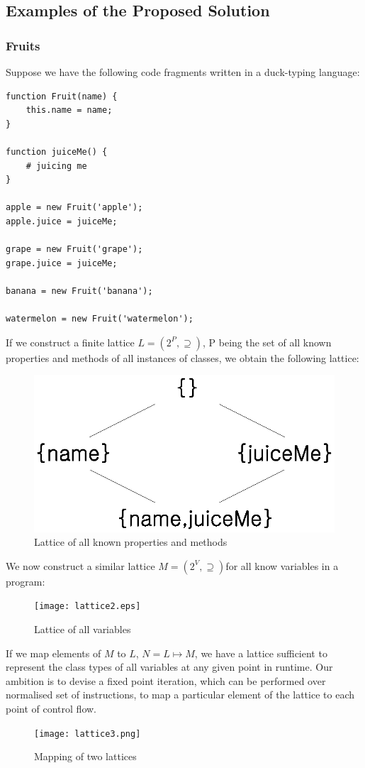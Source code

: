 \documentclass[a4paper,12pt]{article}
\begin{document}
\subsection{Examples of the Proposed Solution}
\subsubsection{Fruits}
Suppose we have the following code fragments written in a duck-typing language:\\
\begin{lstlisting}[caption=Example: Fruits]
function Fruit(name) {
	this.name = name;
}

function juiceMe() {
	# juicing me
}

apple = new Fruit('apple');
apple.juice = juiceMe;

grape = new Fruit('grape');
grape.juice = juiceMe;

banana = new Fruit('banana');

watermelon = new Fruit('watermelon');
\end{lstlisting}
If we construct a finite lattice $L = (2^P, \supseteq)$, P being the set of all known properties and methods of all instances of classes, we obtain the following lattice:\\
\begin{figure}[H]
	\includegraphics{lattice1.eps}
	\centering
	\caption{Lattice of all known properties and methods}
\end{figure}
We now construct a similar lattice $M = (2^V, \supseteq)$for all know variables in a program:\\
\begin{figure}[H]
	\texttt{[image: lattice2.eps]}
	\centering
	\caption{Lattice of all variables}
\end{figure}
If we map elements of $M$ to $L$, $N = L \mapsto M$, we have a lattice sufficient to represent the class types of all variables at any given point in runtime. Our ambition is to devise a fixed point iteration, which can be performed over normalised set of instructions, to map a particular element of the lattice to each point of control flow.\\
\begin{figure}[H]
	\texttt{[image: lattice3.png]}
	\centering
	\caption{Mapping of two lattices}
\end{figure}
\end{document}
